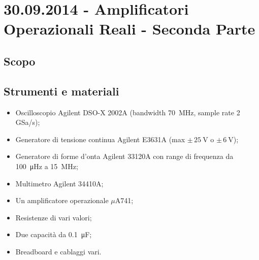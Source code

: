 \section{30.09.2014 - Amplificatori Operazionali Reali - Seconda Parte}

\subsection{Scopo}



\subsection{Strumenti e materiali}

\begin{itemize} [noitemsep]
\item Oscilloscopio Agilent DSO-X 2002A (bandwidth \SI{70}{\mega\hertz}, sample rate \num{2} GSa/s);
\item Generatore di tensione continua Agilent E3631A (max $\pm \, \SI{25}{\volt}$ o $\pm \, \SI{6}{\volt}$);
\item Generatore di forme d'onta Agilent 33120A con range di frequenza da \SI{100}{\micro\hertz} a \SI{15}{\mega\hertz};
\item Multimetro Agilent 34410A;
\item Un amplificatore operazionale $\mu$A741;
\item Resistenze di vari valori;
\item Due capacità da \SI{0.1}{\micro\farad};
\item Breadboard e cablaggi vari.
\end{itemize}
